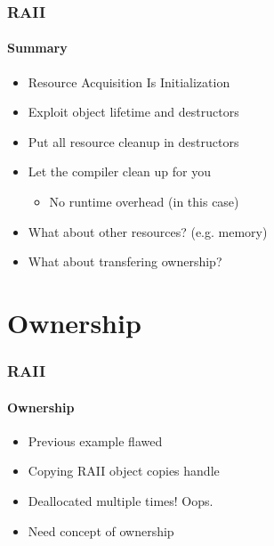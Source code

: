 \begin{frame}
    \frametitle{RAII}
    \framesubtitle{Summary}
    \begin{itemize}
        \item<1->Resource Acquisition Is Initialization 
        \item<1->Exploit object lifetime and destructors
        \item<1->Put all resource cleanup in destructors
        \item<1->Let the compiler clean up for you
            \begin{itemize}
                \item No runtime overhead (in this case)
            \end{itemize}
        \item<2->What about other resources? (e.g. memory)
        \item<2->What about transfering ownership?
    \end{itemize}
\end{frame}


\section{Ownership}
\frame{\sectionpage}

\begin{frame}
    \frametitle{RAII}
    \framesubtitle{Ownership}
    \begin{itemize}
        \item Previous example flawed
        \item Copying RAII object copies handle
        \item Deallocated multiple times! Oops.
        \item Need concept of ownership
    \end{itemize}
\end{frame}

